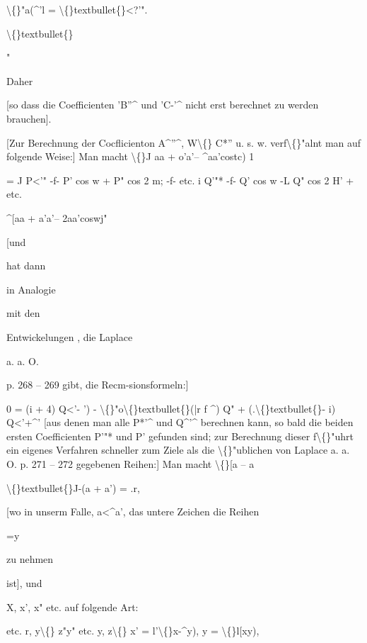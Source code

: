 \documentclass[10pt,a4paper]{article}
\begin{document}
\textbackslash\{\}"a(\textasciicircum{}'l = \textbackslash\{\}textbullet\{\}<?'".

\textbackslash\{\}textbullet\{\}

"

Daher

[so dass die Coefficienten 'B''\textasciicircum{} und 'C-'\textasciicircum{} nicht erst berechnet zu werden brauchen].

\newpage

[Zur Berechnung der Cocflicienton A\textasciicircum{}''\textasciicircum{}, W\textbackslash\{\} C*'' u. s. w. verf\textbackslash\{\}"alnt man auf
folgende Weise:]
Man macht
\textbackslash\{\}J aa + o'a'-- \textasciicircum{}aa'costc)
1

= J P<'" -f- P' cos w + P" cos 2 m; -f- etc.
i Q'"* -f- Q' cos w -L Q" cos 2 H' + etc.

\textasciicircum{}[aa + a'a'-- 2aa'coswj"

[und

hat dann

in Analogie

mit den

Entwickelungen , die Laplace

a. a. O.

p. 268 -- 269 gibt, die Recm-sionsformeln:]

0 = (i + 4) Q<'- ') - \textbackslash\{\}"o\textbackslash\{\}textbullet\{\}(|r f \textasciicircum{}) Q" + (.\textbackslash\{\}textbullet\{\}- i) Q<'+\textasciicircum{}'
[aus denen man alle P*'\textasciicircum{} und Q\textasciicircum{}'\textasciicircum{} berechnen kann, so bald die beiden ersten
Coefficienten P'"* und P' gefunden sind; zur Berechnung dieser f\textbackslash\{\}"uhrt ein
eigenes Verfahren schneller zum Ziele als die \textbackslash\{\}"ublichen von Laplace a. a. O.
p. 271 -- 272 gegebenen Reihen:]
Man macht
\textbackslash\{\}[a -- a

\textbackslash\{\}textbullet\{\}J-(a + a') = .r,

[wo in unserm Falle, a<\textasciicircum{}a', das untere Zeichen
die Reihen

=y

zu nehmen

ist], und

X, x', x" etc.
auf folgende Art:

etc.
r,
y\textbackslash\{\} z"y" etc.
y, z\textbackslash\{\}
x' = l'\textbackslash\{\}x-\textasciicircum{}y),
y = \textbackslash\{\}l[xy),
\end{document}
